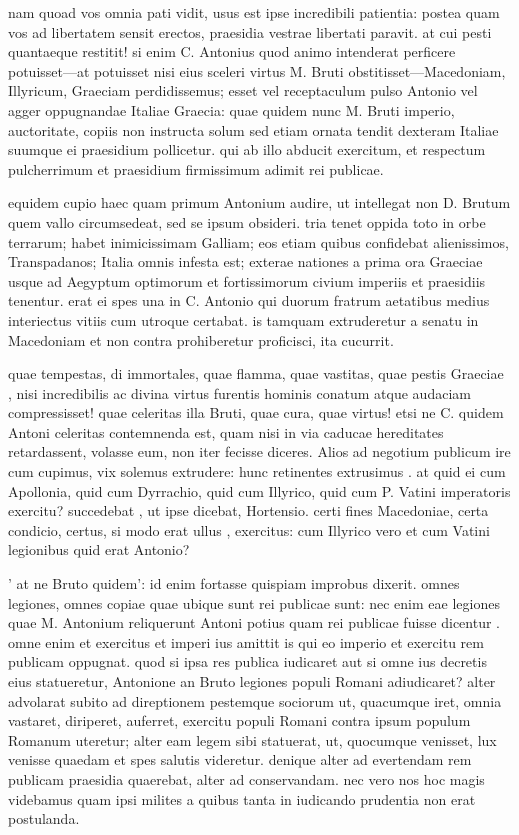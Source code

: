  nam quoad vos omnia pati vidit, usus est ipse incredibili patientia: postea quam vos ad libertatem sensit erectos, praesidia vestrae libertati paravit. at cui pesti quantaeque restitit! si enim C. Antonius quod animo intenderat perficere potuisset—at potuisset nisi eius sceleri virtus M. Bruti obstitisset—Macedoniam, Illyricum, Graeciam perdidissemus; esset vel receptaculum pulso Antonio vel agger oppugnandae Italiae Graecia: quae quidem nunc M. Bruti imperio, auctoritate, copiis non instructa solum sed etiam ornata tendit dexteram Italiae suumque ei praesidium pollicetur. qui ab illo abducit exercitum, et respectum pulcherrimum et praesidium firmissimum adimit rei publicae.

 equidem cupio haec quam primum Antonium audire, ut intellegat non D. Brutum quem vallo circumsedeat, sed se ipsum obsideri. tria tenet oppida toto in orbe terrarum; habet inimicissimam Galliam; eos etiam quibus confidebat alienissimos, Transpadanos; Italia omnis infesta est; exterae nationes a prima ora Graeciae usque ad Aegyptum optimorum et fortissimorum civium imperiis et praesidiis tenentur. erat ei spes una in C. Antonio qui duorum fratrum aetatibus medius interiectus vitiis cum utroque certabat. is tamquam extruderetur a senatu in Macedoniam et non contra prohiberetur proficisci, ita cucurrit.

 quae tempestas, di immortales, quae flamma, quae vastitas, quae pestis Graeciae , nisi incredibilis ac divina virtus furentis hominis conatum atque audaciam compressisset! quae celeritas illa Bruti, quae cura, quae virtus! etsi ne C. quidem Antoni celeritas contemnenda est, quam nisi in via caducae hereditates retardassent, volasse eum, non iter fecisse diceres. Alios ad negotium publicum ire cum cupimus, vix solemus extrudere: hunc retinentes extrusimus . at quid ei cum Apollonia, quid cum Dyrrachio, quid cum Illyrico, quid cum P. Vatini imperatoris exercitu? succedebat , ut ipse dicebat, Hortensio. certi fines Macedoniae, certa condicio, certus, si modo erat ullus , exercitus: cum Illyrico vero et cum Vatini legionibus quid erat Antonio?

 ' at ne Bruto quidem': id enim fortasse quispiam improbus dixerit. omnes legiones, omnes copiae quae ubique sunt rei publicae sunt: nec enim eae legiones quae M. Antonium reliquerunt Antoni potius quam rei publicae fuisse dicentur . omne enim et exercitus et imperi ius amittit is qui eo imperio et exercitu rem publicam oppugnat. quod si ipsa res publica iudicaret aut si omne ius decretis eius statueretur, Antonione an Bruto legiones populi Romani adiudicaret? alter advolarat subito ad direptionem pestemque sociorum ut, quacumque iret, omnia vastaret, diriperet, auferret, exercitu populi Romani contra ipsum populum Romanum uteretur; alter eam legem sibi statuerat, ut, quocumque venisset, lux venisse quaedam et spes salutis videretur. denique alter ad evertendam rem publicam praesidia quaerebat, alter ad conservandam. nec vero nos hoc magis videbamus quam ipsi milites a quibus tanta in iudicando prudentia non erat postulanda.

